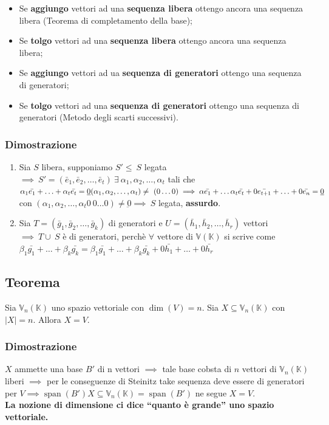 \documentclass{article}
\DeclareMathOperator{\Span}{span}
\newcommand{\V}{\mathbb{V} (\mathbb{K})}
\newcommand{\s}[2]{#1_1, #1_2, \ldots, #1_{#2}}
\newcommand{\Vx}[1]{\mathbb{V}_#1 (\mathbb{K})}
\newcommand{\ah}{\alpha}
\newcommand{\bh}{\beta}
\begin{document}
\begin{itemize}
    \item Se \textbf{aggiungo} vettori ad una \textbf{sequenza libera} ottengo ancora una
          sequenza libera (Teorema di completamento della base);
    \item Se \textbf{tolgo} vettori ad una \textbf{sequenza libera} ottengo ancora una
          sequenza libera;
    \item Se \textbf{aggiungo} vettori ad ua \textbf{sequenza di generatori} ottengo una
          sequenza di generatori;
    \item Se \textbf{tolgo} vettori ad una \textbf{sequenza di generatori} ottengo una
          sequenza di generatori (Metodo degli scarti successivi).
\end{itemize}

\subsubsection{Dimostrazione}
\begin{enumerate}
    \item Sia $S$ libera, supponiamo $S'\leq\ S$ legata $\implies\ S'= (\s{\bar{e}}{t})\
              \exists\ \s{\ah}{t}$ tali che
          $\ah_1\bar{e_1}+\ldots+\ah_t\bar{e_t}=\underbar{0} \\ (\s{\ah}{t}) \ne\
              (0\ldots0)
              \implies\ah\bar{e_1}+\ldots\ah_t\bar{e_t}+0\bar{e_{t+1}}+\ldots+0\bar{e_n} =
              \underbar{0}$ con $ (\s{\ah}{t}0 \ 0 \ldots0)\ne\underbar{0} \implies\ S$
          legata, \textbf{assurdo}.
    \item Sia $T= (\s{\bar{g}}{k})$ di generatori e $U= (\s{\bar{h}}{r})$ vettori
          $\implies\ T \cup\ S$ è di generatori, perchè $\forall$ vettore di $\V$ si
          scrive come $\bh_1\bar{g_1}+\ldots+\bh_k\bar{g_k} = \bh_1
              \bar{g_1}+\ldots+\bh_k \bar{g_k} + 0\bar{h_1}+\ldots+0\bar{h_r}$
\end{enumerate}

\subsection{Teorema}
Sia $\Vx{n}$ uno spazio vettoriale con $\dim(V) = n$. Sia $X\subseteq\Vx{n}$
con $|X| = n$. Allora $X = V$.

\subsubsection{Dimostrazione}
$X$ ammette una base $B'$ di n vettori $\implies$ tale base cobsta di $n$ vettori di $\Vx{n}$ liberi $\implies$ per le conseguenze di Steinitz take sequenza deve essere di generatori per $V\implies\Span(B') X\subseteq\Vx{n}=\Span(B')$ ne segue $X = V$.\\
\textbf{La nozione di dimensione ci dice ``quanto è grande'' uno spazio vettoriale.}
\end{document}
